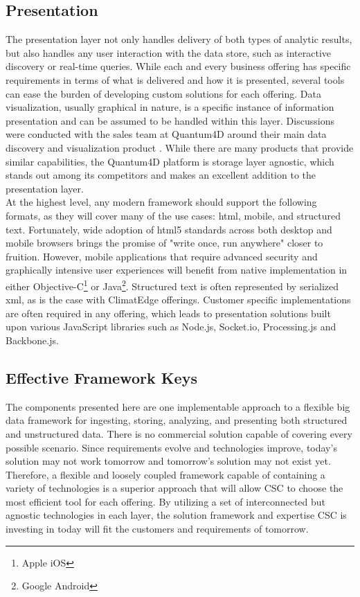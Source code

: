 \subsection{Presentation}
The presentation layer not only handles delivery of both types of analytic results, but also handles any user interaction with the data store, such as interactive discovery or real-time queries. While each and every business offering has specific requirements in terms of what is delivered and how it is presented, several tools can ease the burden of developing custom solutions for each offering. Data visualization, usually graphical in nature, is a specific instance of information presentation and can be assumed to be handled within this layer. Discussions were conducted with the sales team at Quantum4D around their main data discovery and visualization product \cite{quantum}. While there are many products that provide similar capabilities, the Quantum4D platform is storage layer agnostic, which stands out among its competitors and makes an excellent addition to the presentation layer.\\

At the highest level, any modern framework should support the following formats, as they will cover many of the use cases: \gls{html}, mobile, and structured text. Fortunately, wide adoption of \gls{html}5 standards across both desktop and mobile browsers brings the promise of "write once, run anywhere" closer to fruition. However, mobile applications that require advanced security and graphically intensive user experiences will benefit from native implementation in either Objective-C\footnote{Apple iOS} or Java\footnote{Google Android}. Structured text is often represented by serialized \gls{xml}, as is the case with ClimatEdge offerings. Customer specific implementations are often required in any offering, which leads to presentation solutions built upon various JavaScript libraries such as Node.js, Socket.io, Processing.js and Backbone.js.
\subsection{Effective Framework Keys}
The components presented here are one implementable approach to a flexible big data framework for ingesting, storing, analyzing, and presenting both structured and unstructured data. There is no commercial solution capable of covering every possible scenario. Since requirements evolve and technologies improve, today's solution may not work tomorrow and tomorrow's solution may not exist yet. Therefore, a flexible and loosely coupled framework capable of containing a variety of technologies is a superior approach that will allow \textsc{CSC} to choose the most efficient tool for each offering. By utilizing a set of interconnected but agnostic technologies in each layer, the solution framework and expertise \textsc{CSC} is investing in today will fit the customers and requirements of tomorrow.
